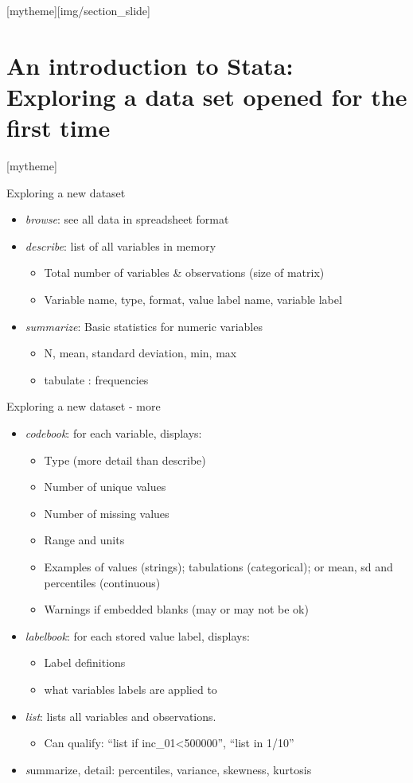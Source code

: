 \documentclass[aspectratio=169]{beamer}
\newcommand{\sectionpic}[2]{
	\setbeamertemplate{section page}[mytheme][#2]
	\section{#1}
	\setbeamertemplate{section page}[mytheme]
}
\begin{document}
\sectionpic{An introduction to Stata: \newline Exploring a data set opened for the first time}{img/section_slide}


\begin{frame}{Exploring a new dataset}
\begin{itemize}
\item {\protect\textit{browse}}: see all data in spreadsheet format
\item \textit {describe}: list of all variables in memory
	\begin{itemize}
		\item Total number of variables \& observations (size of matrix)
		\item Variable name, type, format, value label name, variable label
	\end{itemize}
\item \textit {summarize}: Basic statistics for numeric variables
	\begin{itemize}
		\item N, mean, standard deviation, min, max
		\item tabulate : frequencies
	\end{itemize}
\end{itemize}
\end{frame}

\begin{frame}{Exploring a new dataset - more}
\begin{itemize}
\item \textit{codebook}: for each variable, displays:
	\begin{itemize}
		\item Type (more detail than describe)
		\item Number of unique values
		\item Number of missing values
		\item Range and units
		\item Examples of values (strings); tabulations (categorical); or mean, sd and percentiles (continuous)
		\item Warnings if embedded blanks (may or may not be ok)
	\end{itemize}
\item \textit {labelbook}: for each stored value label, displays:
	\begin{itemize}
		\item Label definitions
		\item what variables labels are applied to
	\end{itemize}
\item \textit {list}: lists all variables and observations. 
	\begin{itemize}
		\item Can qualify: “list if inc\_01<500000”, “list in 1/10”
	\end{itemize}
\item \textit summarize, detail: percentiles, variance, skewness, kurtosis
\end{itemize}
\end{frame}
\end{document}
